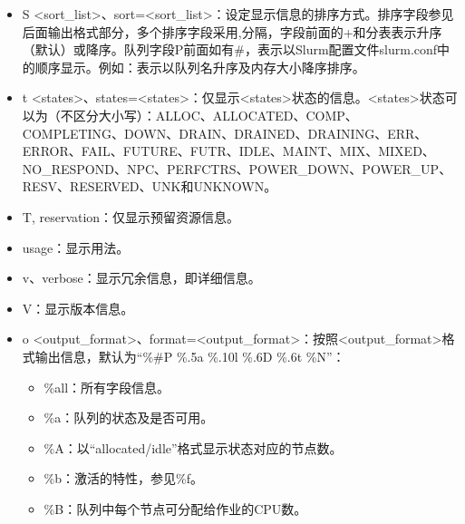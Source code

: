 \documentclass[a4paper,12pt,english]{sphinxmanual}
\begin{document}
\begin{itemize}
\item {} 
\sphinxAtStartPar
\sphinxhyphen{}S <sort\_list>、\sphinxhyphen{}\sphinxhyphen{}sort=<sort\_list>：设定显示信息的排序方式。排序字段参见后面输出格式部分，多个排序字段采用,分隔，字段前面的+和\sphinxhyphen{}分表表示升序（默认）或降序。队列字段P前面如有\#，表示以Slurm配置文件slurm.conf中的顺序显示。例如：表示以队列名升序及内存大小降序排序。

\item {} 
\sphinxAtStartPar
\sphinxhyphen{}t <states>、\sphinxhyphen{}\sphinxhyphen{}states=<states>：仅显示<states>状态的信息。<states>状态可以为（不区分大小写）：ALLOC、ALLOCATED、COMP、COMPLETING、DOWN、DRAIN、DRAINED、DRAINING、ERR、ERROR、FAIL、FUTURE、FUTR、IDLE、MAINT、MIX、MIXED、NO\_RESPOND、NPC、PERFCTRS、POWER\_DOWN、POWER\_UP、RESV、RESERVED、UNK和UNKNOWN。

\item {} 
\sphinxAtStartPar
\sphinxhyphen{}T, \sphinxhyphen{}\sphinxhyphen{}reservation：仅显示预留资源信息。

\item {} 
\sphinxAtStartPar
\sphinxhyphen{}\sphinxhyphen{}usage：显示用法。

\item {} 
\sphinxAtStartPar
\sphinxhyphen{}v、\sphinxhyphen{}\sphinxhyphen{}verbose：显示冗余信息，即详细信息。

\item {} 
\sphinxAtStartPar
\sphinxhyphen{}V：显示版本信息。

\item {} 
\sphinxAtStartPar
\sphinxhyphen{}o <output\_format>、\sphinxhyphen{}\sphinxhyphen{}format=<output\_format>：按照<output\_format>格式输出信息，默认为“\%\#P \%.5a \%.10l \%.6D \%.6t \%N”：
\begin{itemize}
\item {} 
\sphinxAtStartPar
\%all：所有字段信息。

\item {} 
\sphinxAtStartPar
\%a：队列的状态及是否可用。

\item {} 
\sphinxAtStartPar
\%A：以“allocated/idle”格式显示状态对应的节点数。

\item {} 
\sphinxAtStartPar
\%b：激活的特性，参见\%f。

\item {} 
\sphinxAtStartPar
\%B：队列中每个节点可分配给作业的CPU数。


\end{itemize}
\end{itemize}
\end{document}
